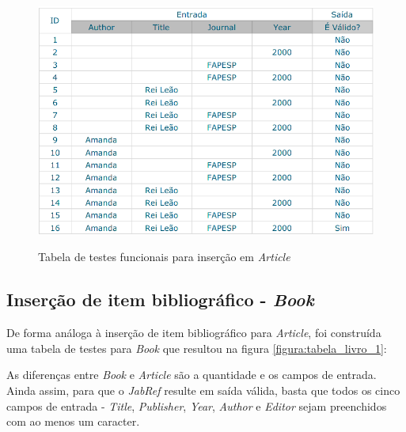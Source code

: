     \begin{figure}[H]
        \caption{Tabela de testes funcionais para inserção em \textit{Article}}
        \vspace{0.5cm}
        \centering
        \includegraphics[width=15cm]{images/tabela_artigo.png}
        \label{figura:tabela_artigo}
    \end{figure}

    \subsection{Inserção de item bibliográfico - \textit{Book}}
        De forma análoga à inserção de item bibliográfico para \textit{Article}, foi construída uma tabela de testes para \textit{Book} que resultou na figura \ref{figura:tabela_livro_1}:
        \par As diferenças entre \textit{Book} e \textit{Article} são a quantidade e os campos de entrada. Ainda assim, para que o \textit{JabRef} resulte em saída válida, basta que todos os cinco campos de entrada - \textit{Title}, \textit{Publisher}, \textit{Year}, \textit{Author} e \textit{Editor} sejam preenchidos com ao menos um caracter.
    
